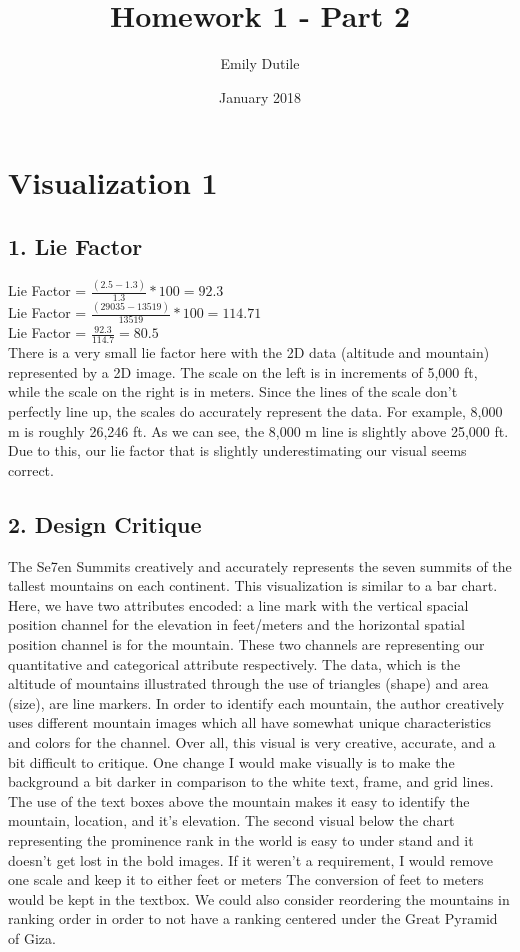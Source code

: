 \documentclass{neu_handout}
\title{Homework 1 - Part 2}
\author{Emily Dutile}
\date{January 2018}
\begin{document}
\section*{Visualization 1}

\subsection*{1. Lie Factor}

Lie Factor = $ \frac{(2.5 - 1.3)}{1.3} * 100 = 92.3 $
\\

Lie Factor = $ \frac{(29035 - 13519)}{13519} * 100 = 114.71 $
\\

Lie Factor = $ \frac{92.3}{114.7} = 80.5 $
\\

There is a very small lie factor here with the 2D data (altitude and mountain) represented by a 2D image. The scale on the left is in increments of 5,000 ft, while the scale on the right is in meters. Since the lines of the scale don't perfectly line up, the scales do accurately represent the data. For example, 8,000 m is roughly 26,246 ft. As we can see, the 8,000 m line is slightly above 25,000 ft. Due to this, our lie factor that is slightly underestimating our visual seems correct.


\subsection*{2. Design Critique}

The Se7en Summits creatively and accurately represents the seven summits of the tallest mountains on each continent. This visualization is similar to a bar chart. Here, we have two attributes encoded: a line mark with the vertical spacial position channel for the elevation in feet/meters and the horizontal spatial position channel is for the mountain. These two channels are representing our quantitative and categorical attribute respectively. The data, which is the altitude of mountains illustrated through the use of triangles (shape) and area (size), are line markers. In order to identify each mountain, the author creatively  uses different mountain images which all have somewhat unique characteristics and colors for the channel. Over all, this visual is very creative, accurate, and a bit difficult to critique. One change I would make visually is to make the background a bit darker in comparison to the white text, frame, and grid lines. The use of the text boxes above the mountain makes it easy to identify the mountain, location, and it's elevation. The second visual below the chart representing the prominence rank in the world is easy to under stand and it doesn't get lost in the bold images. If it weren't a requirement, I would remove one scale and keep it to either feet or meters The conversion of feet to meters would be kept in the textbox. We could also consider reordering the mountains in ranking order in order to not have a ranking centered under the Great Pyramid of Giza.
\end{document}
